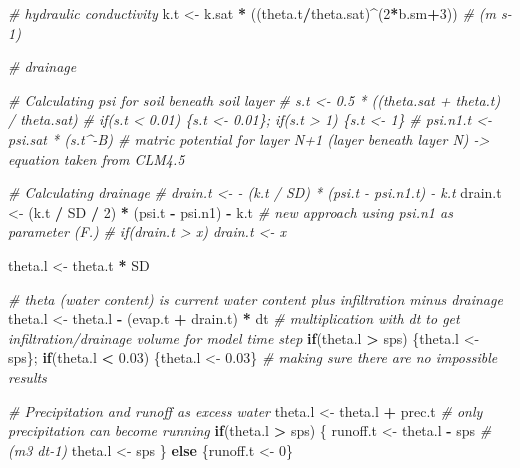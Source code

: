 \documentclass[
]{article}
\newenvironment{Shaded}{\begin{snugshade}}{\end{snugshade}}
\newcommand{\CommentTok}[1]{\textcolor[rgb]{0.56,0.35,0.01}{\textit{#1}}}
\newcommand{\ControlFlowTok}[1]{\textcolor[rgb]{0.13,0.29,0.53}{\textbf{#1}}}
\newcommand{\DecValTok}[1]{\textcolor[rgb]{0.00,0.00,0.81}{#1}}
\newcommand{\FloatTok}[1]{\textcolor[rgb]{0.00,0.00,0.81}{#1}}
\newcommand{\NormalTok}[1]{#1}
\newcommand{\OperatorTok}[1]{\textcolor[rgb]{0.81,0.36,0.00}{\textbf{#1}}}
\newcommand{\StringTok}[1]{\textcolor[rgb]{0.31,0.60,0.02}{#1}}
\begin{document}
\begin{Shaded}
\begin{Highlighting}[]
{{{{    \CommentTok{# hydraulic conductivity}
\NormalTok{    k.t <-}\StringTok{ }\NormalTok{k.sat }\OperatorTok{*}\StringTok{ }\NormalTok{((theta.t}\OperatorTok{/}\NormalTok{theta.sat)}\OperatorTok{^}\NormalTok{(}\DecValTok{2}\OperatorTok{*}\NormalTok{b.sm}\OperatorTok{+}\DecValTok{3}\NormalTok{))  }\CommentTok{# (m s-1)}

    \CommentTok{# drainage}
    
    \CommentTok{# Calculating psi for soil beneath soil layer}
    \CommentTok{# s.t <- 0.5 * ((theta.sat + theta.t) / theta.sat)}
    \CommentTok{# if(s.t < 0.01) \{s.t <- 0.01\}; if(s.t > 1) \{s.t <- 1\}}
    \CommentTok{# psi.n1.t <- psi.sat * (s.t^-B)  # matric potential for layer N+1 (layer beneath layer N) -> equation taken from CLM4.5}

    \CommentTok{# Calculating drainage}
    \CommentTok{# drain.t <- - (k.t / SD) * (psi.t - psi.n1.t) - k.t}
\NormalTok{    drain.t <-}\StringTok{ }\NormalTok{(k.t }\OperatorTok{/}\StringTok{ }\NormalTok{SD }\OperatorTok{/}\StringTok{ }\DecValTok{2}\NormalTok{) }\OperatorTok{*}\StringTok{ }\NormalTok{(psi.t }\OperatorTok{-}\StringTok{ }\NormalTok{psi.n1) }\OperatorTok{-}\StringTok{ }\NormalTok{k.t }\CommentTok{# new approach using psi.n1 as parameter (F.)}
    \CommentTok{# if(drain.t > x) drain.t <- x}
    
\NormalTok{    theta.l <-}\StringTok{ }\NormalTok{theta.t }\OperatorTok{*}\StringTok{ }\NormalTok{SD}
    
    \CommentTok{# theta (water content) is current water content plus infiltration minus drainage}
\NormalTok{    theta.l <-}\StringTok{ }\NormalTok{theta.l }\OperatorTok{-}\StringTok{ }\NormalTok{(evap.t }\OperatorTok{+}\StringTok{ }\NormalTok{drain.t) }\OperatorTok{*}\StringTok{ }\NormalTok{dt  }\CommentTok{# multiplication with dt to get infiltration/drainage volume for model time step}
    \ControlFlowTok{if}\NormalTok{(theta.l }\OperatorTok{>}\StringTok{ }\NormalTok{sps) \{theta.l <-}\StringTok{ }\NormalTok{sps\}; }\ControlFlowTok{if}\NormalTok{(theta.l }\OperatorTok{<}\StringTok{ }\FloatTok{0.03}\NormalTok{) \{theta.l <-}\StringTok{ }\FloatTok{0.03}\NormalTok{\} }\CommentTok{# making sure there are no impossible results}
    
    \CommentTok{# Precipitation and runoff as excess water}
\NormalTok{    theta.l <-}\StringTok{ }\NormalTok{theta.l }\OperatorTok{+}\StringTok{ }\NormalTok{prec.t }\CommentTok{# only precipitation can become running}
    \ControlFlowTok{if}\NormalTok{(theta.l }\OperatorTok{>}\StringTok{ }\NormalTok{sps) \{}
\NormalTok{      runoff.t <-}\StringTok{ }\NormalTok{theta.l }\OperatorTok{-}\StringTok{ }\NormalTok{sps      }\CommentTok{# (m3 dt-1)}
\NormalTok{      theta.l <-}\StringTok{ }\NormalTok{sps}
\NormalTok{    \} }\ControlFlowTok{else}\NormalTok{ \{runoff.t <-}\StringTok{ }\DecValTok{0}\NormalTok{\}}
    

}}}}
\end{Highlighting}
\end{Shaded}
\end{document}
